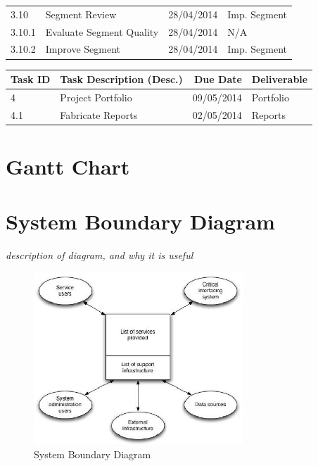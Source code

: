 \begin{tabular}{llrl}
    3.10     & Segment Review               & 28/04/2014  & Imp. Segment      \\
    3.10.1   & Evaluate Segment Quality     & 28/04/2014  & N/A               \\
    3.10.2   & Improve Segment              & 28/04/2014  & Imp. Segment      \\
    
    \bottomrule
\end{tabular}

\pagebreak

\begin{tabular}{llrl}
    
    \toprule
    
    Task ID  & Task Description (Desc.)     & Due Date    & Deliverable       \\
    
    \midrule
    
    4        & Project Portfolio            & 09/05/2014  & Portfolio         \\
    4.1      & Fabricate Reports            & 02/05/2014  & Reports           \\
    
    \bottomrule

\end{tabular}

\pagebreak

\section{Gantt Chart}


\section{System Boundary Diagram}
\textit{description of diagram, and why it is useful}
\begin{figure}[h]
    \centering
    \includegraphics[width=0.7\textwidth]{images/requirements/system_boundary_diagram.png}
    \caption{System Boundary Diagram}
    \label{fig:sys_boundary_diag}
\end{figure}
